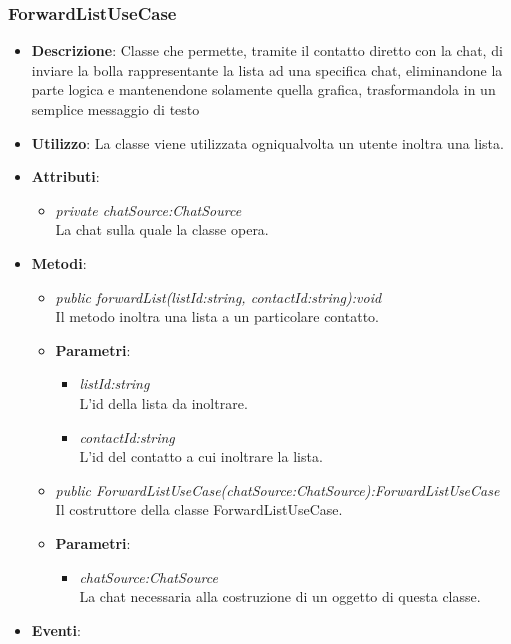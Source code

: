 \subsubsection{ForwardListUseCase}
\begin{itemize}
\item \textbf{Descrizione}: Classe che permette, tramite il contatto diretto con la chat, di inviare la bolla rappresentante la lista ad una specifica chat, eliminandone la parte logica e mantenendone solamente quella grafica, trasformandola in un semplice messaggio di testo
\item \textbf{Utilizzo}: La classe viene utilizzata ogniqualvolta un utente inoltra una lista.
\item \textbf{Attributi}: 
	\begin{itemize}
	\item \textit{private chatSource:ChatSource}\\
	La chat sulla quale la classe opera.
	\end{itemize}
\item \textbf{Metodi}:
	\begin{itemize}
	\item \textit{public forwardList(listId:string, contactId:string):void}\\
	Il metodo inoltra una lista a un particolare contatto.
			\item{\textbf{Parametri}: \begin{itemize}
			\item \textit{listId:string}\\
			L'id della lista da inoltrare.
			\item \textit{contactId:string}\\
			L'id del contatto a cui inoltrare la lista.
			\end{itemize}}
	\item \textit{public ForwardListUseCase(chatSource:ChatSource):ForwardListUseCase}\\
	Il costruttore della classe ForwardListUseCase.
			\item{\textbf{Parametri}: \begin{itemize}
			\item \textit{chatSource:ChatSource}\\
			La chat necessaria alla costruzione di un oggetto di questa classe.
			\end{itemize}}
	\end{itemize}
\item \textbf{Eventi}:
\end{itemize}

